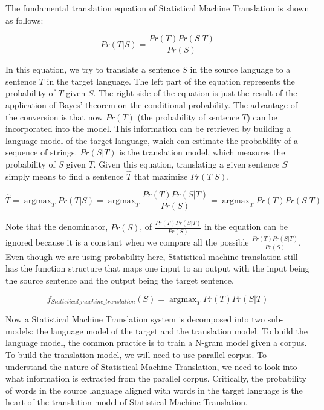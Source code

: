 \documentclass[final]{ua-thesis}
\numberwithin{equation}{section}
\DeclareMathOperator*{\argmax}{argmax}
\begin{document}
The fundamental translation equation of Statistical Machine Translation is shown as follows:

\begin{equation}
Pr(T|S)=\frac{Pr(T)Pr(S|T)}{Pr(S)}
\end{equation}

In this equation, we try to translate a sentence $S$ in the source language to a sentence $T$ in the target language. The left part of the equation represents the probability of $T$ given $S$. 
The right side of the equation is just the result of the application of Bayes' theorem on the conditional probability. 
The advantage of the conversion is that now $Pr(T)$ (the probability of sentence $T$) can be incorporated into the model. 
This information can be retrieved by building a language model of the target language, which can estimate the probability of a sequence of strings. $Pr(S|T)$ is the translation model, which measures the probability of $S$ given $T$. 
Given this equation, translating a given sentence $S$ simply means to find a sentence $\hat{T}$ that maximize $Pr(T|S)$.   

\begin{equation}
\hat{T}= \argmax_{T} Pr(T|S) = \argmax_{T} \frac{Pr(T)Pr(S|T)}{Pr(S)} = \argmax_{T} Pr(T)Pr(S|T)
\end{equation}

Note that the denominator, $Pr(S)$, of $\frac{Pr(T)Pr(S|T)}{Pr(S)}$ in the equation can be ignored because it is a constant when we compare all the possible $\frac{Pr(T)Pr(S|T)}{Pr(S)}$. Even though we are using probability here, Statistical machine translation still has the function structure that maps one input to an output with the input being the source sentence and the output being the target sentence. 

\begin{equation}
f_{Statistical\_machine\_translation}(S)=\argmax_{T} Pr(T)Pr(S|T)
\end{equation}

Now a Statistical Machine Translation system is decomposed into two sub-models: the language model of the target and the translation model. 
To build the language model, the common practice is to train a N-gram model given a corpus. 
To build the translation model, we will need to use parallel corpus. 
To understand the nature of Statistical Machine Translation, we need to look into what information is extracted from the parallel corpus. Critically, the probability of words in the source language aligned with words in the target language is the heart of the translation model of Statistical Machine Translation. 
\end{document}

